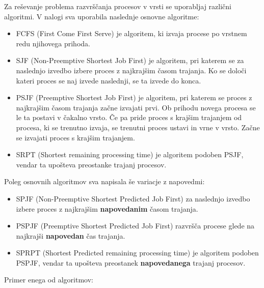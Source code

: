 \documentclass[a4paper, pt14]{article}
\begin{document}
Za reševanje problema razvrščanja procesov v vrsti se uporabljaj različni algoritmi. V nalogi sva uporabila naslednje osnovne algoritme:
\begin{itemize}
  \item FCFS (First Come First Serve) je algoritem, ki izvaja procese po vrstnem redu njihovega prihoda.
  \item SJF (Non-Preemptive Shortest Job First) je algoritem, pri katerem se za naslednjo izvedbo izbere proces z najkrajšim časom trajanja. Ko se določi kateri proces se naj izvede naslednji, se ta izvede do konca. 
  \item PSJF (Preemptive Shortest Job First) je algoritem, pri katerem se proces z najkrajšim časom trajanja začne izvajati prvi. Ob prihodu novega procesa se le ta postavi v čakalno vrsto. Če pa pride proces s krajšim trajanjem od procesa, ki se trenutno izvaja, se trenutni proces ustavi in vrne v vrsto. Začne se izvajati proces s krajšim trajanjem.
  \item SRPT (Shortest remaining processing time) je algoritem podoben PSJF, vendar ta upošteva preostanke trajanj procesov.
\end{itemize}

Poleg osnovnih algoritmov sva napisala še variacje z napovedmi:

\begin{itemize}
  \item SPJF (Non-Preemptive Shortest Predicted Job First) za naslednjo izvedbo izbere proces z najkrajšim \textbf{napovedanim} časom trajanja. 
  \item PSPJF (Preemptive Shortest Predicted Job First) razvršča procese glede na najkrajši \textbf{napovedan} čas trajanja.
  \item SPRPT (Shortest Predicted remaining processing time) je algoritem podoben PSPJF, vendar ta upošteva preostanek \textbf{napovedanega} trajanj procesov.
\end{itemize}

Primer enega od algoritmov:
\end{document}
